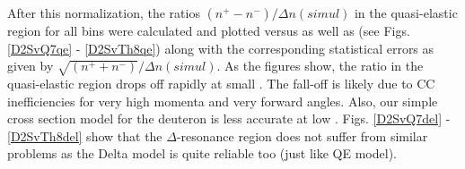After this normalization, the ratios $(n^+ - n^-)/\Delta n(simul)$ in the quasi-elastic region for all \qsqs %
bins were calculated and plotted versus \qsqs as well as \ths %
(see Figs. \ref{D2SvQ7qe} - \ref{D2SvTh8qe})
along with the corresponding statistical errors as given by $\sqrt{(n^+ + n^-)}/\Delta n(simul)$. As the figures show, the ratio in the quasi-elastic region drops %
off rapidly at small \qsq. The fall-off is likely due to CC inefficiencies for very high momenta and very forward angles. Also, our simple cross section model for the deuteron is less accurate at low \qsq.  Figs. \ref{D2SvQ7del} - \ref{D2SvTh8del} show that the $\Delta$-resonance region does not suffer from similar problems %
as the Delta model is quite reliable too (just like QE model).

